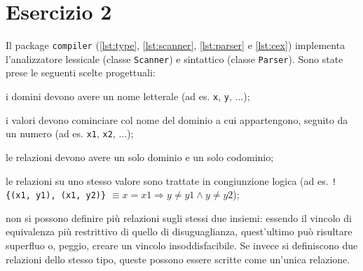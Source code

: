\section*{Esercizio 2}

Il package {\tt compiler} (\autoref{lst:type}, \ref{lst:scanner},
\ref{lst:parser} e \ref{lst:cex}) implementa l'analizzatore lessicale (classe
{\tt Scanner}) e sintattico (classe {\tt Parser}). Sono state prese le seguenti
scelte progettuali: %
%
\begin{enumerate*}

    \item i domini devono avere un nome letterale (ad es. {\tt x}, {\tt y}, ...);

    \item i valori devono cominciare col nome del dominio a cui appartengono,
    seguito da un numero (ad es. {\tt x1}, {\tt x2}, ...);

    \item le relazioni devono avere un solo dominio e un solo codominio;

    \item le relazioni su uno stesso valore sono trattate in congiunzione logica
    (ad es. {\tt !\{(x1, y1), (x1, y2)\}} $\equiv x = x1 \Rightarrow y \neq y1
    \land y \neq y2$);

    \item non si possono definire più relazioni sugli stessi due insiemi:
    essendo il vincolo di equivalenza più restrittivo di quello di
    disuguaglianza, quest'ultimo può risultare superfluo o, peggio, creare un
    vincolo insoddisfacibile. Se invece si definiscono due relazioni dello
    stesso tipo, queste possono essere scritte come un'unica relazione.

\end{enumerate*}





